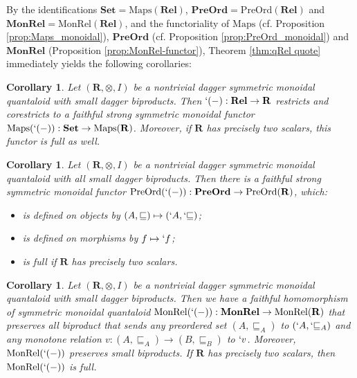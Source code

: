 \documentclass[12pt]{tac}
\newtheorem{corollary}[theorem]{Corollary}
\theoremstyle{definition}
\theoremstyle{remark}
\newcommand{\<}{\langle}
\renewcommand{\>}{\rangle}
\renewcommand{\:}{\colon}
\begin{document}
By the identifications $\mathbf{Set}=\mathrm{Maps}(\mathbf{Rel})$, $\mathbf{PreOrd}=\mathrm{PreOrd}(\mathbf{Rel})$ and $\mathbf{MonRel}=\mathrm{MonRel}(\mathbf{Rel})$, and the functoriality of $\mathrm{Maps}$ (cf. Proposition \ref{prop:Maps_monoidal}), $\mathbf{PreOrd}$ (cf. Proposition \ref{prop:PreOrd_monoidal}) and $\mathbf{MonRel}$ (Proposition \ref{prop:MonRel-functor}), Theorem \ref{thm:qRel quote} immediately yields the following corollaries:

\begin{corollary}\label{cor:qSet quote}
    Let $(\mathbf R,\otimes,I)$ be a nontrivial dagger symmetric monoidal quantaloid with small dagger biproducts. Then $`(-):\mathbf{Rel}\to\mathbf R$ restricts and corestricts to a faithful strong symmetric monoidal functor $\mathrm{Maps}(`(-)):\mathbf{Set}\to\mathrm{Maps}(\mathbf R)$. Moreover, if $\mathbf R$ has precisely two scalars, this functor is full as well. 
\end{corollary}



\begin{corollary}\label{cor:qPOS quote}   Let $(\mathbf R,\otimes, I)$ be a nontrivial dagger symmetric monoidal quantaloid with all small dagger biproducts. 
Then there is a  faithful strong symmetric monoidal functor $\mathrm{PreOrd}(`(-)):\mathbf{PreOrd}\to\mathrm{PreOrd}(\mathbf R)$, which:
\begin{itemize} \item is defined on objects by $(A,\sqsubseteq)\mapsto (`A,`{\sqsubseteq})$;
\item is defined on morphisms by  $f\mapsto `f$;
\item is full if $\mathbf R$ has precisely two scalars.
    \end{itemize}
\end{corollary}




\begin{corollary}\label{cor:qMonRel quote}Let $(\mathbf R,\otimes,I)$ be a nontrivial dagger symmetric monoidal quantaloid with small dagger biproducts. Then we have a faithful homomorphism of symmetric monoidal quantaloid  $\mathrm{MonRel}(`(-)):\mathbf{MonRel}\to\mathrm{MonRel}(\mathbf R)$ that preserves all biproduct that sends any preordered set $(A,\sqsubseteq_A)$ to $(`A,`{\sqsubseteq_A})$ and any monotone relation $v:(A,\sqsubseteq_A)\to(B,\sqsubseteq_B)$ to $`v$. Moreover, $\mathrm{MonRel}(`(-))$ preserves small biproducts. If $\mathbf R$ has precisely two scalars, then $\mathrm{MonRel}(`(-))$ is full.
\end{corollary}
\end{document}
